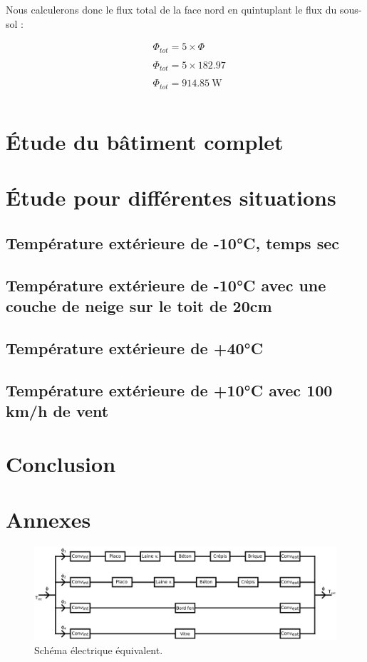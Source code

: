 \documentclass[12pt, a4paper]{article}
\newcommand{\phiTot}{\ensuremath{\Phi_{tot}}}
\begin{document}
 Nous calculerons donc le flux total de la face nord en quintuplant le flux du sous-sol :

\begin{align*}
 & \phiTot = 5 \times \Phi \\ \\
 & \phiTot = 5 \times 182.97 \\ \\
 & \boxed{\phiTot = \SI{914.85}{\watt}} \\ \\
\end{align*}

\section{Étude du bâtiment complet}

\section{Étude pour différentes situations}

\subsection{Température extérieure de -10°C, temps sec}

\subsection{Température extérieure de -10°C avec une couche de neige sur le toit de 20cm}

\subsection{Température extérieure de +40°C}

\subsection{Température extérieure de +10°C avec 100 km/h de vent}

\section{Conclusion}

\newpage

\phantom{.}
\vfill
\centering

\section{Annexes}

\vfill

\newpage

\begin{figure}
 \centering
 \includegraphics[width=\textwidth]{Schémas/Schéma - Équivalence électrique.png}
 \caption{Schéma électrique équivalent.}
 \label{Schéma - équivalent}
\end{figure}
\end{document}
